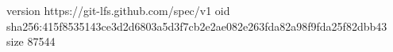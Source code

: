 version https://git-lfs.github.com/spec/v1
oid sha256:415f8535143ce3d2d6803a5d3f7cb2e2ae082e263fda82a98f9fda25f82dbb43
size 87544
